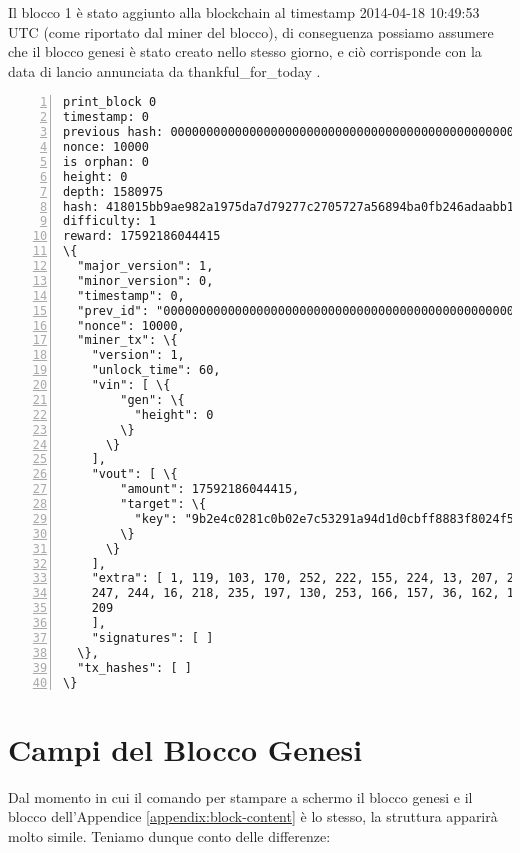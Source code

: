 \begin{appendices}
Il blocco 1 è stato aggiunto alla blockchain al timestamp 2014-04-18 10:49:53 UTC (come riportato dal miner del blocco), di conseguenza possiamo assumere che il blocco genesi è stato creato nello stesso giorno, e ciò corrisponde con la data di lancio annunciata da thankful\_for\_today \cite{bitmonero-launched}.

\begin{Verbatim}[commandchars=\\\{\}, numbers=left]
print_block 0
timestamp: 0
previous hash: 0000000000000000000000000000000000000000000000000000000000000000
nonce: 10000
is orphan: 0
height: 0
depth: 1580975
hash: 418015bb9ae982a1975da7d79277c2705727a56894ba0fb246adaabb1f4632e3
difficulty: 1
reward: 17592186044415
\{
  "major_version": 1,
  "minor_version": 0,
  "timestamp": 0,
  "prev_id": "0000000000000000000000000000000000000000000000000000000000000000",
  "nonce": 10000,
  "miner_tx": \{
    "version": 1,
    "unlock_time": 60,
    "vin": [ \{
        "gen": \{
          "height": 0
        \}
      \}
    ],
    "vout": [ \{
        "amount": 17592186044415,
        "target": \{
          "key": "9b2e4c0281c0b02e7c53291a94d1d0cbff8883f8024f5142ee494ffbbd088071"
        \}
      \}
    ],
    "extra": [ 1, 119, 103, 170, 252, 222, 155, 224, 13, 207, 208, 152, 113, 94, 188, 
    247, 244, 16, 218, 235, 197, 130, 253, 166, 157, 36, 162, 142, 157, 11, 200, 144, 
    209
    ],
    "signatures": [ ]
  \},
  "tx_hashes": [ ]
\}
\end{Verbatim}



\section*{Campi del Blocco Genesi}

Dal momento in cui il comando per stampare a schermo il blocco genesi e il blocco dell'Appendice \ref{appendix:block-content} è lo stesso, la struttura apparirà molto simile. Teniamo dunque conto delle differenze:


\end{appendices}
